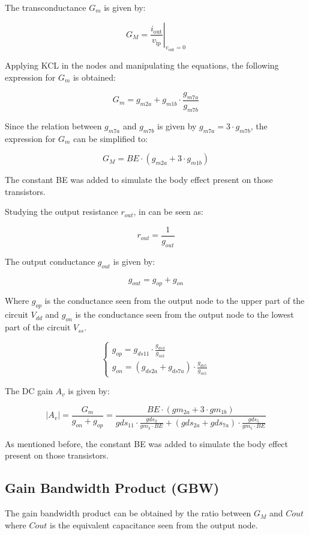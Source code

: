 The transconductance $G_m$ is given by:

$$G_M = \left. \frac{i_{\text{out}}}{v_{\text{ip}}} \right|_{v_{\text{out}}=0}$$

Applying KCL in the nodes and manipulating the equations, the following expression for $G_m$ is obtained:

$$G_m = g_{m2a} + g_{m1b} \cdot \frac{g_{m7a}}{g_{m7b}}$$

Since the relation between $g_{m7a}$ and $g_{m7b}$ is given by $g_{m7a} = 3 \cdot g_{m7b}$, the expression for $G_m$ can be simplified to:  

$$G_M = BE \cdot (g_{m2a} + 3 \cdot g_{m1b})$$

The constant BE was added to simulate the body effect present on those transistors.

Studying the output resistance $r_{out}$, in can be seen as:

$$r_{out} = \frac{1}{g_{out}}$$

The output conductance $g_{out}$ is given by:

$$g_{out} = g_{op} + g_{on}$$

Where $g_{op}$ is the conductance seen from the output node to the upper part of the circuit $V_{dd}$ and $g_{on}$ is the conductance seen from the output node to the lowest part of the circuit $V_{ss}$.

\begin{equation}
    \begin{cases}
        g_{op} = g_{ds11} \cdot \frac{g_{ds3}}{g_{m3}} \\
        g_{on} = \left( g_{ds2a} + g_{ds7a} \right) \cdot \frac{g_{ds5}}{g_{m5}}
    \end{cases}
\end{equation}

The DC gain $A_v$ is given by:

$$|A_v| = \frac{G_m}{g_{on} + g_{op}} = \frac{BE \cdot (gm_{2a} + 3 \cdot gm_{1b})}{gds_{11} \cdot \frac{gds_{3}}{gm_{3}\cdot BE} + (gds_{2a} + gds_{7a}) \cdot \frac{gds_{5}}{gm_{5} \cdot BE}}$$

As mentioned before, the constant BE was added to simulate the body effect present on those transistors.


\subsection{Gain Bandwidth Product (GBW)}
The gain bandwidth product can be obtained by the ratio between $G_M$ and $C{out}$ where $C{out}$ is the equivalent capacitance seen from the output node.

